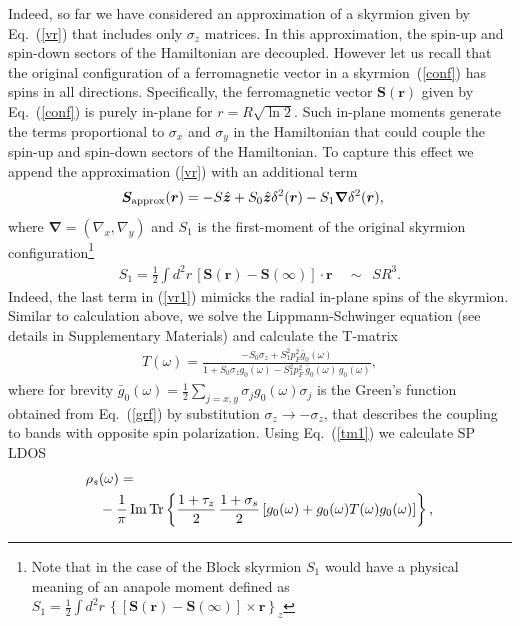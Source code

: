 \documentclass[twocolumn,showpacs,floatfix,longbibliography]{revtex4-1}
\begin{document}
Indeed, so far we have considered an approximation of a skyrmion given by Eq.~(\ref{vr}) that includes only $\sigma_z$ matrices. In this approximation, the spin-up and spin-down sectors of the Hamiltonian are decoupled. However let us recall that the original configuration of a ferromagnetic vector in a skyrmion~(\ref{conf}) has spins in all directions. Specifically, the ferromagnetic vector $\bm S(\bm r)$ given by Eq.~(\ref{conf}) is purely in-plane for $r = R \sqrt{\ln 2}$. Such in-plane moments generate the terms proportional to $\sigma_x$ and $\sigma_y$ in the Hamiltonian that could couple the spin-up and spin-down sectors of the Hamiltonian. To capture this effect we append the approximation (\ref{vr}) with an additional term 
\begin{align}
	\bm S_{\rm approx}(\bm r) & =  - S \hat{\bm z} + S_0 \hat{\bm z} \delta^2(\bm r)-S_1 \bm \nabla \delta^2(\bm r), \label{vr1}
\end{align}
where  $\bm \nabla = (\nabla_x,\nabla_y)$ and $S_1$ is the first-moment of the original skyrmion configuration\footnote{Note that in the case of the Block skyrmion $S_1$ would have a physical meaning of an anapole moment defined as $S_1 = \frac{1}{2}\int  d^2r \, \left\{\left[\bm S(\bm r)-\bm S(\infty)\right] \times \bm r\right\}_z$ }
\begin{align}
	S_1 = \frac{1}{2}\int  d^2r \, \left[\bm S(\bm r)-\bm S(\infty)\right] \cdot \bm r\quad \sim \,\,\,SR^3. \label{S1}
\end{align}
Indeed, the last term in (\ref{vr1}) mimicks the radial in-plane spins of the skyrmion. Similar to calculation above, we solve the Lippmann-Schwinger equation (see details in Supplementary Materials) and calculate the T-matrix 
\begin{align}
	T(\omega) =   \frac{-S_0\sigma_z+S^2_1p_F^2\bar g_{0}(\omega)}{1+S_0\sigma_zg_{0}(\omega)-S^2_1p_F^2\,\bar g_{0}(\omega)\, g_{0}(\omega)}, \label{tm1} 
\end{align}
where for brevity $\bar g_0(\omega) = \frac{1}{2}\sum_{j=x,y} \sigma_j g_0(\omega) \sigma_j $ is the Green's function obtained from Eq.~(\ref{grf}) by substitution $\sigma_z\rightarrow -\sigma_z$, that describes the coupling to bands with opposite spin polarization. Using Eq.~(\ref{tm1}) we calculate SP LDOS 
\begin{align}
	\rho_s & (\omega) = \label{ldos} \\ 
	&-\frac{1}{\pi}\,{\rm Im}{\rm \,Tr} \left\{  \frac{1+\tau_z}{2}\,\frac{1+\sigma_s}{2} \left[g_0(\omega)+g_0(\omega) T(\omega) g_0(\omega)  \right]\right\},\nonumber 
 \end{align}
\end{document}
